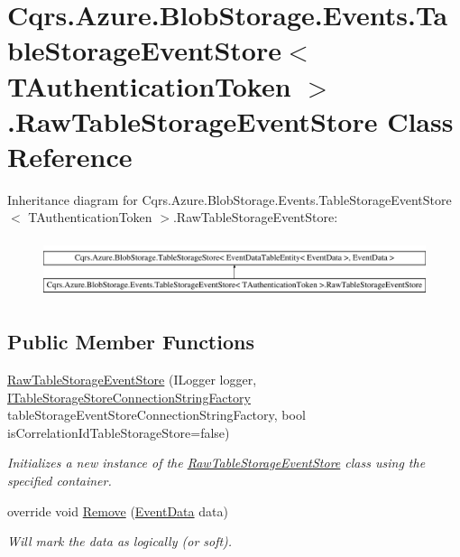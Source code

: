 \hypertarget{classCqrs_1_1Azure_1_1BlobStorage_1_1Events_1_1TableStorageEventStore_1_1RawTableStorageEventStore}{}\section{Cqrs.\+Azure.\+Blob\+Storage.\+Events.\+Table\+Storage\+Event\+Store$<$ T\+Authentication\+Token $>$.Raw\+Table\+Storage\+Event\+Store Class Reference}
\label{classCqrs_1_1Azure_1_1BlobStorage_1_1Events_1_1TableStorageEventStore_1_1RawTableStorageEventStore}
Inheritance diagram for Cqrs.\+Azure.\+Blob\+Storage.\+Events.\+Table\+Storage\+Event\+Store$<$ T\+Authentication\+Token $>$.Raw\+Table\+Storage\+Event\+Store\+:\begin{figure}[H]
\begin{center}
\leavevmode
\includegraphics[height=1.723077cm]{classCqrs_1_1Azure_1_1BlobStorage_1_1Events_1_1TableStorageEventStore_1_1RawTableStorageEventStore}
\end{center}
\end{figure}
\subsection*{Public Member Functions}
\begin{DoxyCompactItemize}
\item 
\hyperlink{classCqrs_1_1Azure_1_1BlobStorage_1_1Events_1_1TableStorageEventStore_1_1RawTableStorageEventStore_aa6aa02462732467a16148e0d094cd308}{Raw\+Table\+Storage\+Event\+Store} (I\+Logger logger, \hyperlink{interfaceCqrs_1_1Azure_1_1BlobStorage_1_1ITableStorageStoreConnectionStringFactory}{I\+Table\+Storage\+Store\+Connection\+String\+Factory} table\+Storage\+Event\+Store\+Connection\+String\+Factory, bool is\+Correlation\+Id\+Table\+Storage\+Store=false)
\begin{DoxyCompactList}\small\item\em Initializes a new instance of the \hyperlink{classCqrs_1_1Azure_1_1BlobStorage_1_1Events_1_1TableStorageEventStore_1_1RawTableStorageEventStore}{Raw\+Table\+Storage\+Event\+Store} class using the specified container. \end{DoxyCompactList}\item 
override void \hyperlink{classCqrs_1_1Azure_1_1BlobStorage_1_1Events_1_1TableStorageEventStore_1_1RawTableStorageEventStore_a0c71f309e7ec1a349f4862c7021661de}{Remove} (\hyperlink{classCqrs_1_1Events_1_1EventData}{Event\+Data} data)
\begin{DoxyCompactList}\small\item\em Will mark the {\itshape data}  as logically (or soft). \end{DoxyCompactList}\end{DoxyCompactItemize}
